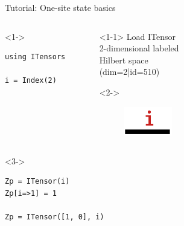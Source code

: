 \begin{frame}[fragile]{Tutorial: One-site state basics}

\begin{columns}

\begin{column}[T]{0.48\textwidth}
\begin{onlyenv}<1->
\begin{lstlisting}[language=JuliaLocal, style=julia, basicstyle=\small]
using ITensors

i = Index(2)

 \end{lstlisting}
\end{onlyenv}
\end{column}

\begin{column}[T]{0.48\textwidth}

\begin{onlyenv}<1-1>
Load ITensor \\[\baselineskip]
2-dimensional labeled \\
Hilbert space \\
(dim=2|id=510)
\end{onlyenv}

\begin{onlyenv}<2->
\begin{figure}[T]
  \includegraphics[width=0.3\textwidth]{
    slides/assets/i.png
  }
\end{figure}
\end{onlyenv}

\end{column}


\end{columns}

\begin{columns}

\begin{column}[T]{0.48\textwidth}
\begin{onlyenv}<3->
\begin{lstlisting}[language=JuliaLocal, style=julia, basicstyle=\small]
Zp = ITensor(i)
Zp[i=>1] = 1

Zp = ITensor([1, 0], i)
\end{lstlisting}
\end{onlyenv}
\end{column}


\end{columns}
\end{frame}
